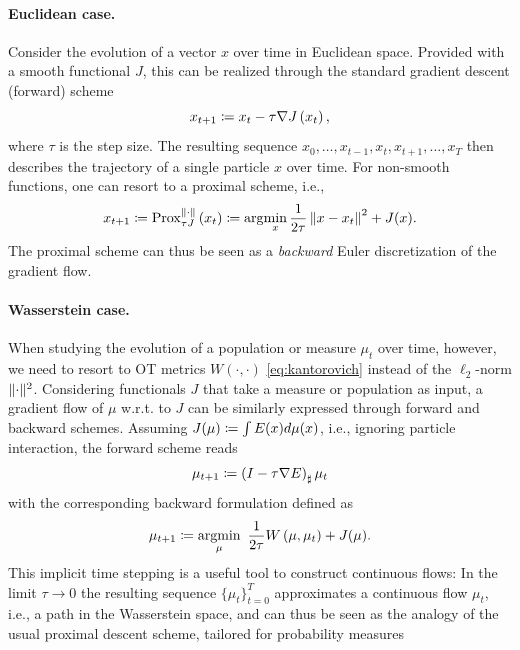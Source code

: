 \paragraph{Euclidean case.}
Consider the evolution of a vector $x$ over time in Euclidean space. Provided with a smooth functional $J$, this can be realized through the standard gradient descent (forward) scheme
\begin{equation*}
	x_{t+1} \coloneqq x_{t}-\tau \nabla J\left(x_{t}\right),
\end{equation*}
where $\tau$ is the step size. The resulting sequence ${x_0, \dots, x_{t-1}, x_{t}, x_{t+1}, \dots, x_T}$ then describes the trajectory of a single particle $x$ over time.
For non-smooth functions, one can resort to a proximal scheme, i.e.,
\begin{equation*}
	x_{t+1} \coloneqq \operatorname{Prox}_{\tau J}^{\|\cdot\|}\left(x_{t}\right) \coloneqq \arg\!\min_x \frac{1}{2\tau}\left\| x-x_t\right\|^2+ J(x).
\end{equation*}
The proximal scheme can thus be seen as a \emph{backward} Euler discretization of the gradient flow.

\paragraph{Wasserstein case.}
When studying the evolution of a population or measure $\mu_t$ over time, however, we need to resort to \acrlong{OT} metrics $W(\cdot, \cdot)$ \eqref{eq:kantorovich} instead of the $\ell_2$-norm $\lVert\cdot\rVert^2$.
Considering functionals $J$ that take a measure or population as input, a gradient flow of $\mu$ w.r.t. to $J$ can be similarly expressed through forward and backward schemes. Assuming $J(\mu) 
\coloneqq \int E(x) d \mu(x)$, i.e., ignoring particle interaction, the forward scheme reads
\begin{equation*}
	\mu_{t+1}\coloneqq\left(I-\tau \nabla E\right)_{\sharp} \mu_t
\end{equation*}
with the corresponding backward formulation defined as
\begin{equation}
	\label{eq:jko}
	\mu_{t+1}\coloneqq\underset{\mu}{\operatorname{argmin}} \enspace \frac{1}{2\tau}W\left(\mu, \mu_t\right)+ J(\mu).
\end{equation}
This implicit time stepping is a useful tool to construct continuous flows: In the limit $\tau \rightarrow 0$ the resulting sequence $\{\mu_t\}_{t=0}^T$ approximates a continuous flow $\mu_t$, i.e., a path in the Wasserstein space, and can thus be seen as the analogy of the usual proximal descent scheme, tailored for probability measures~\citep[p.285]{santambrogio2015optimal}

